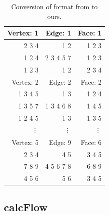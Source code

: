 \documentclass[12pt]{article}
\begin{document}
\begin{table}
\begin{center}
\begin{tabular}{|r|r|r|}
\hline
 Vertex: 1 &    Edge: 1 &    Face: 1 \\ \hline 

     2 3 4 &        1 2 &     1 2 3  \\

    1 2 4  & 2 3 4 5 7  &     1 2 3  \\

    1 2 3  &       1 2  &     2 3 4  \\ \hline 

 Vertex: 2 &    Edge: 2 &    Face: 2 \\ \hline

   1 3 4 5 &        1 3 &     1 2 4  \\

  1 3 5 7  & 1 3 4 6 8  &     1 4 5  \\

  1 2 4 5  &       1 3  &     1 3 5  \\ \hline 

 			\vdots & \vdots & \vdots \\ \hline 

 Vertex: 5 &    Edge: 9 &    Face: 6 \\ \hline

     2 3 4 &        4 5 &     3 4 5  \\

    7 8 9  & 4 5 6 7 8  &     6 8 9  \\

     4 5 6 &       5 6  &     3 4 5  \\
\hline
\end{tabular}
\end{center}
\caption{Conversion of format from \cite{lutzmanifold} to ours.}
\label{tab:format}
\end{table}  

\subsection{calcFlow}
\end{document}
